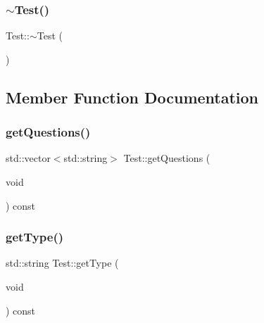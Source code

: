 \hypertarget{class_test_a2b0a62f1e667bbe8d8cb18d785bfa991}{}\label{class_test_a2b0a62f1e667bbe8d8cb18d785bfa991} 
\subsubsection{\texorpdfstring{$\sim$\+Test()}{~Test()}}
{\footnotesize\ttfamily Test\+::$\sim$\+Test (\begin{DoxyParamCaption}{ }\end{DoxyParamCaption})\hspace{0.3cm}{\ttfamily [inline]}}



\subsection{Member Function Documentation}
\hypertarget{class_test_ac4d3f0b5a8786de3713e93e46c8b2f97}{}\label{class_test_ac4d3f0b5a8786de3713e93e46c8b2f97} 
\subsubsection{\texorpdfstring{get\+Questions()}{getQuestions()}}
{\footnotesize\ttfamily std\+::vector$<$std\+::string$>$ Test\+::get\+Questions (\begin{DoxyParamCaption}\item[{void}]{ }\end{DoxyParamCaption}) const\hspace{0.3cm}{\ttfamily [inline]}}

\hypertarget{class_test_ae550830721b9cfff6b9251d9b96bd99e}{}\label{class_test_ae550830721b9cfff6b9251d9b96bd99e} 
\subsubsection{\texorpdfstring{get\+Type()}{getType()}}
{\footnotesize\ttfamily std\+::string Test\+::get\+Type (\begin{DoxyParamCaption}\item[{void}]{ }\end{DoxyParamCaption}) const\hspace{0.3cm}{\ttfamily [inline]}}

\hypertarget{class_test_abda6e061511f23c4dfc47b6083ea5fef}{}\label{class_test_abda6e061511f23c4dfc47b6083ea5fef} 
